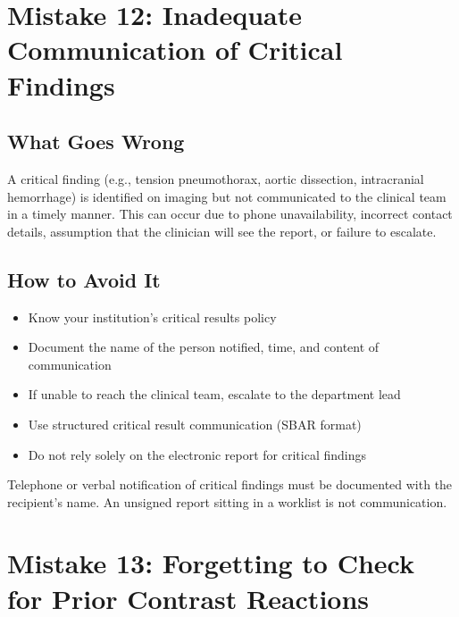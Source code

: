 \clearpage

\section{Mistake 12: Inadequate Communication of Critical Findings}

\subsection{What Goes Wrong}
A critical finding (e.g., tension pneumothorax, aortic dissection, intracranial hemorrhage) is identified on imaging but not communicated to the clinical team in a timely manner. This can occur due to phone unavailability, incorrect contact details, assumption that the clinician will see the report, or failure to escalate.

\subsection{How to Avoid It}
\begin{itemize}
    \item Know your institution's critical results policy
    \item Document the name of the person notified, time, and content of communication
    \item If unable to reach the clinical team, escalate to the department lead
    \item Use structured critical result communication (SBAR format)
    \item Do not rely solely on the electronic report for critical findings
\end{itemize}

\begin{pearlbox}
Telephone or verbal notification of critical findings must be documented with the recipient's name. An unsigned report sitting in a worklist is not communication.
\end{pearlbox}

\clearpage

\section{Mistake 13: Forgetting to Check for Prior Contrast Reactions}

